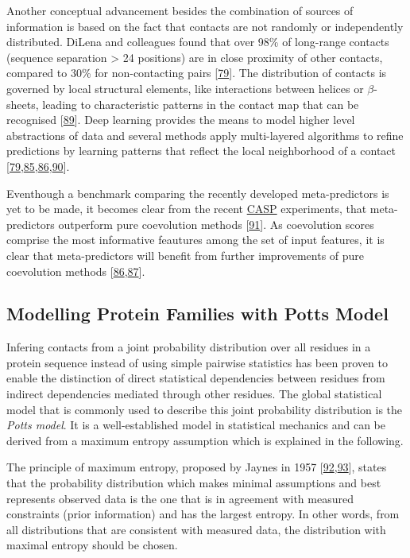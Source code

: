 \documentclass[11pt,a4paper,twoside]{book}
\theoremstyle{definition}
\theoremstyle{definition}
\theoremstyle{remark}
\begin{document}
Another conceptual advancement besides the combination of sources of
information is based on the fact that contacts are not randomly or
independently distributed. DiLena and colleagues found that over 98\% of
long-range contacts (sequence separation \textgreater{} 24 positions)
are in close proximity of other contacts, compared to 30\% for
non-contacting pairs {[}\protect\hyperlink{ref-DiLena2012a}{79}{]}. The
distribution of contacts is governed by local structural elements, like
interactions between helices or \(\beta\)-sheets, leading to
characteristic patterns in the contact map that can be recognised
{[}\protect\hyperlink{ref-Andreani2015a}{89}{]}. Deep learning provides
the means to model higher level abstractions of data and several methods
apply multi-layered algorithms to refine predictions by learning
patterns that reflect the local neighborhood of a contact
{[}\protect\hyperlink{ref-DiLena2012a}{79},\protect\hyperlink{ref-Jones2015a}{85},\protect\hyperlink{ref-Wang2016a}{86},\protect\hyperlink{ref-Skwark2014a}{90}{]}.

Eventhough a benchmark comparing the recently developed meta-predictors
is yet to be made, it becomes clear from the recent
\protect\hyperlink{abbrev}{CASP} experiments, that meta-predictors
outperform pure coevolution methods
{[}\protect\hyperlink{ref-Monastyrskyy2015}{91}{]}. As coevolution
scores comprise the most informative feautures among the set of input
features, it is clear that meta-predictors will benefit from further
improvements of pure coevolution methods
{[}\protect\hyperlink{ref-Wang2016a}{86},\protect\hyperlink{ref-Stahl2017}{87}{]}.

\subsection{Modelling Protein Families with Potts Model}\label{maxent}

Infering contacts from a joint probability distribution over all
residues in a protein sequence instead of using simple pairwise
statistics has been proven to enable the distinction of direct
statistical dependencies between residues from indirect dependencies
mediated through other residues. The global statistical model that is
commonly used to describe this joint probability distribution is the
\emph{Potts model}. It is a well-established model in statistical
mechanics and can be derived from a maximum entropy assumption which is
explained in the following.

The principle of maximum entropy, proposed by Jaynes in 1957
{[}\protect\hyperlink{ref-Jaynes1957a}{92},\protect\hyperlink{ref-Jaynes1957b}{93}{]},
states that the probability distribution which makes minimal assumptions
and best represents observed data is the one that is in agreement with
measured constraints (prior information) and has the largest entropy. In
other words, from all distributions that are consistent with measured
data, the distribution with maximal entropy should be chosen.
\end{document}

